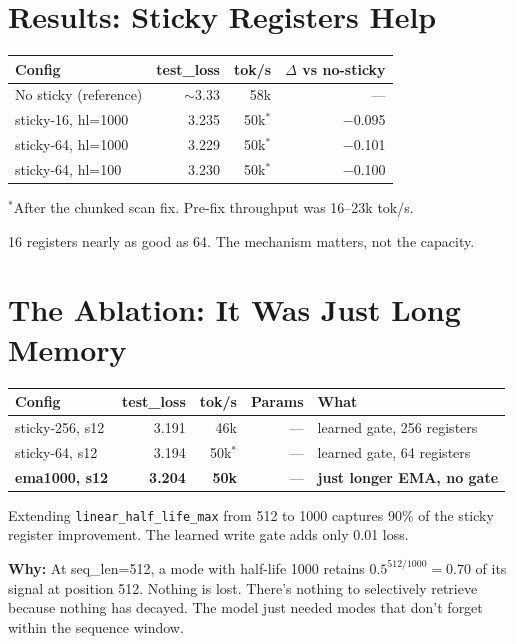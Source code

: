 \documentclass[11pt,a4paper]{report}
\begin{document}
\section{Results: Sticky Registers Help}

\begin{center}
\begin{tabular}{lrrr}
\toprule
Config & test\_loss & tok/s & $\Delta$ vs no-sticky \\
\midrule
No sticky (reference) & $\sim$3.33 & 58k & --- \\
sticky-16, hl=1000 & 3.235 & 50k$^*$ & $-$0.095 \\
sticky-64, hl=1000 & 3.229 & 50k$^*$ & $-$0.101 \\
sticky-64, hl=100 & 3.230 & 50k$^*$ & $-$0.100 \\
\bottomrule
\end{tabular}
\end{center}

$^*$After the chunked scan fix. Pre-fix throughput was 16--23k tok/s.

16 registers nearly as good as 64. The mechanism matters, not the capacity.

\section{The Ablation: It Was Just Long Memory}

\begin{center}
\begin{tabular}{lrrrl}
\toprule
Config & test\_loss & tok/s & Params & What \\
\midrule
sticky-256, s12 & 3.191 & 46k & --- & learned gate, 256 registers \\
sticky-64, s12 & 3.194 & 50k$^*$ & --- & learned gate, 64 registers \\
\textbf{ema1000, s12} & \textbf{3.204} & \textbf{50k} & --- & \textbf{just longer EMA, no gate} \\
\bottomrule
\end{tabular}
\end{center}

Extending \texttt{linear\_half\_life\_max} from 512 to 1000 captures 90\% of the sticky register improvement. The learned write gate adds only 0.01 loss.

\textbf{Why:} At seq\_len=512, a mode with half-life 1000 retains $0.5^{512/1000} = 0.70$ of its signal at position 512. Nothing is lost. There's nothing to selectively retrieve because nothing has decayed. The model just needed modes that don't forget within the sequence window.
\end{document}

